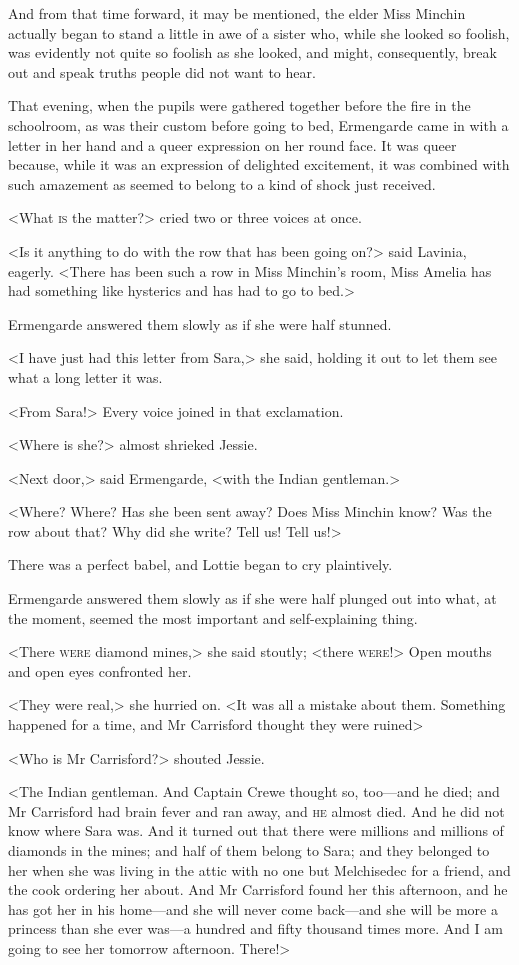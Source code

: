 And from that time forward, it may be mentioned, the elder Miss Minchin actually began to stand a little in awe of a sister who, while she looked so foolish, was evidently not quite so foolish as she looked, and might, consequently, break out and speak truths people did not want to hear.

That evening, when the pupils were gathered together before the fire in the schoolroom, as was their custom before going to bed, Ermengarde came in with a letter in her hand and a queer expression on her round face. It was queer because, while it was an expression of delighted excitement, it was combined with such amazement as seemed to belong to a kind of shock just received.

<What \textsc{is} the matter?> cried two or three voices at once.

<Is it anything to do with the row that has been going on?> said Lavinia, eagerly. <There has been such a row in Miss Minchin's room, Miss Amelia has had something like hysterics and has had to go to bed.>

Ermengarde answered them slowly as if she were half stunned.

<I have just had this letter from Sara,> she said, holding it out to let them see what a long letter it was.

<From Sara!> Every voice joined in that exclamation.

<Where is she?> almost shrieked Jessie.

<Next door,> said Ermengarde, <with the Indian gentleman.>

<Where? Where? Has she been sent away? Does Miss Minchin know? Was the row about that? Why did she write? Tell us! Tell us!>

There was a perfect babel, and Lottie began to cry plaintively.

Ermengarde answered them slowly as if she were half plunged out into what, at the moment, seemed the most important and self-explaining thing.

<There \textsc{were} diamond mines,> she said stoutly; <there \textsc{were}!> Open mouths and open eyes confronted her.

<They were real,> she hurried on. <It was all a mistake about them. Something happened for a time, and Mr Carrisford thought they were ruined\longdash>

<Who is Mr Carrisford?> shouted Jessie.

<The Indian gentleman. And Captain Crewe thought so, too—and he died; and Mr Carrisford had brain fever and ran away, and \textsc{he} almost died. And he did not know where Sara was. And it turned out that there were millions and millions of diamonds in the mines; and half of them belong to Sara; and they belonged to her when she was living in the attic with no one but Melchisedec for a friend, and the cook ordering her about. And Mr Carrisford found her this afternoon, and he has got her in his home—and she will never come back—and she will be more a princess than she ever was—a hundred and fifty thousand times more. And I am going to see her tomorrow afternoon. There!>

